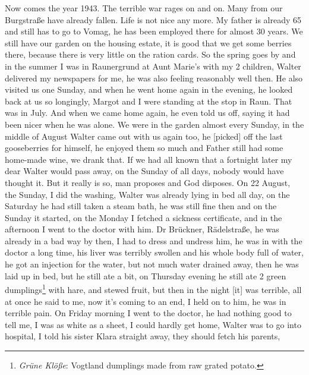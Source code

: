 \documentclass[a5paper,11pt,openany]{book}
\newcommand{\seite}[1]{\leavevmode\marginpar{\footnotesize\itshape\raggedright #1}\ignorespaces}
\begin{document}
Now comes the year 1943.
The terrible war rages on and on.
Many from our Burgstraße have already fallen.
Life is not nice any more.
My father is already 65 and still has to go to Vomag, he has been employed there for almost 30 years.
We still have our garden on the housing estate,
  it is good that we get some berries there, because there is very little on the ration cards.
So the spring goes by
\seite{59}
and in the summer I was in Raunergrund at Aunt Marie's with my 2 children,
  Walter delivered my newspapers for me, he was also feeling reasonably well then.
He also visited us one Sunday, and when he went home again in the evening, he looked back at us so longingly,
  Margot and I were standing at the stop in Raun.
That was in July.
And when we came home again, he even told us off,
  saying it had been nicer when
\seite{60}
he was alone.
We were in the garden almost every Sunday, in the middle of August Walter came out with us again too,
  he [picked] off the last gooseberries for himself,
  he enjoyed them so much and Father still had some home-made wine,
  we drank that.
If we had all known that a fortnight later my dear Walter would pass away, on the Sunday of all days,
  nobody would have thought it.
But it really is so, man proposes and God disposes.
On 22 August, the Sunday, I did the washing, Walter was already lying in bed
\seite{61}
all day, on the Saturday he had still taken a steam bath,
  he was still fine then and on the Sunday it started,
  on the Monday I fetched a sickness certificate, and in the afternoon I went to the doctor with him.
Dr Brückner, Rädelstraße, he was already in a bad way by then,
  I had to dress and undress him, he was in with the doctor a long time,
  his liver was terribly swollen and his whole body full of water,
  he got an injection for the water, but not
\seite{62}
much water drained away, then he was laid up in bed, but he still ate a bit,
  on Thursday evening he still ate 2 green dumplings\footnote{\emph{Grüne Klöße}: Vogtland dumplings made from raw grated potato.} with hare, and stewed fruit,
  but then in the night [it] was terrible, all at once he said to me, now it's coming to an end, I held on to him,
  he was in terrible pain.
On Friday morning I went to the doctor, he had nothing good to tell me,
  I was as white as a sheet, I could hardly get home, Walter was to go into hospital,
\seite{63}
I told his sister Klara straight away, they should fetch his parents,
\end{document}
